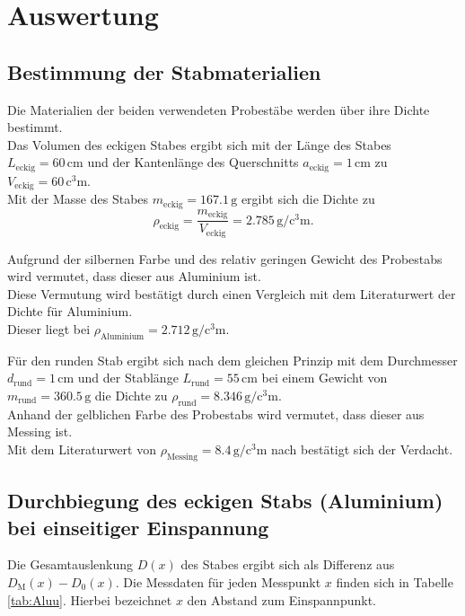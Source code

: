 \section{Auswertung}
\label{sec:Auswertung}
\subsection{Bestimmung der Stabmaterialien}
Die Materialien der beiden verwendeten Probestäbe werden über ihre Dichte bestimmt.\\
Das Volumen des eckigen Stabes ergibt sich mit der Länge des Stabes $L_{\mathrm{eckig}}=60\,\si{\centi\meter}$
und der Kantenlänge des Querschnitts $a_{\mathrm{eckig}}=1\,\si{\centi\meter}$ zu $V_{\mathrm{eckig}}=60\,\si{\cubic\centi\meter}$.\\
Mit der Masse des Stabes $m_{\mathrm{eckig}}=167.1\,\si{\gram}$ ergibt sich die Dichte zu
\begin{equation}
	\rho_{\mathrm{eckig}}=\frac{m_{\mathrm{eckig}}}{V_{\mathrm{eckig}}}=2.785 \,\si{\gram\per\cubic\centi\meter}\text{.}
\end{equation}

Aufgrund der silbernen Farbe und des relativ geringen Gewicht des Probestabs wird vermutet, dass dieser aus Aluminium ist.\\
Diese Vermutung wird bestätigt durch einen Vergleich mit dem Literaturwert der Dichte für Aluminium.\\
Dieser liegt bei $\rho_{\mathrm{Aluminium}}=2.712\,\si{\gram\per\cubic\centi\meter}$. \cite{Werkzeugkiste}

Für den runden Stab ergibt sich nach dem gleichen Prinzip mit dem Durchmesser $d_{\mathrm{rund}}=1\,\si{\centi\meter}$ und der Stablänge $L_{\mathrm{rund}}=55\,\si{\centi\meter}$ bei einem
Gewicht von $m_{\mathrm{rund}}=360.5\,\si{\gram}$ die Dichte zu $\rho_{\mathrm{rund}}=8.346 \,\si{\gram\per\cubic\centi\meter}$.\\
Anhand der gelblichen Farbe des Probestabs wird vermutet, dass dieser aus Messing ist.\\
Mit dem Literaturwert von $\rho_{\mathrm{Messing}}=8.4\,\si{\gram\per\cubic\centi\meter}$ nach \cite{Werkzeugkiste} %
bestätigt sich der Verdacht.

\FloatBarrier
\subsection{Durchbiegung des eckigen Stabs (Aluminium) bei einseitiger Einspannung}
Die Gesamtauslenkung $D(x)$ des Stabes ergibt sich als Differenz aus $D_{\mathrm{M}}(x)-D_{\mathrm{0}}(x)$.
Die Messdaten für jeden Messpunkt $x$ finden sich in Tabelle \ref{tab:Aluu}. Hierbei bezeichnet $x$ den Abstand zum Einspannpunkt.

